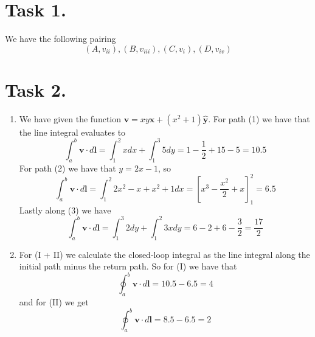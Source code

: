\documentclass[a4paper,11pt]{article}
\begin{document}


\section*{Task 1.}
We have the following pairing
\[
    ( A, v_{ii} ), ( B, v_{iii} ), ( C, v_{i} ), ( D, v_{iv} )
\]

\section*{Task 2.}
\begin{enumerate}
    \item We have given the function $\mathbf{v} = xy\mathbf{\hat{x}} + (x^2 + 1)\mathbf{\hat{y}}$. For path
        (1) we have that the line integral evaluates to
        \[
            \int_{a}^{b}{\mathbf{v} \cdot d\mathbf{l}} = \int_{1}^{2}{x dx} + \int_{1}^{3}{5 dy} = 1 - \frac{1}{2} + 15 - 5 = 10.5
        \]
        For path (2) we have that $y = 2x - 1$, so
        \[
            \int_{a}^{b}{\mathbf{v} \cdot d\mathbf{l}} = \int_{1}^{2}{2x^2 - x + x^2 + 1 dx} = \left[x^3 -\frac{x^2}{2} + x \right]_{1}^{2} = 6.5
        \]
        Lastly along (3) we have
        \[
            \int_{a}^{b}{\mathbf{v} \cdot d\mathbf{l}} = \int_{1}^{3}{2 dy} + \int_{1}^{2}{3x dy} = 6 - 2 + 6 - \frac{3}{2} = \frac{17}{2}
        \]
    \item For (I + II) we calculate the closed-loop integral as the line integral along the initial path minus the return path. So for (I) we have
        that 
        \[
            \oint_{a}^{b}{\mathbf{v} \cdot d\mathbf{l}} = 10.5 - 6.5 = 4
        \]
        and for (II) we get
        \[
            \oint_{a}^{b}{\mathbf{v} \cdot d\mathbf{l}} = 8.5 - 6.5 = 2
        \]
\end{enumerate}
\end{document}
